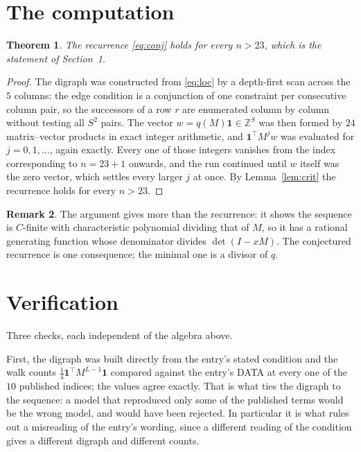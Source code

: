 \documentclass[11pt,a4paper]{article}
\theoremstyle{plain}
\newtheorem{theorem}{Theorem}
\theoremstyle{definition}
\newtheorem{remark}[theorem]{Remark}
\begin{document}
\section{The computation}

\begin{theorem}
The recurrence \eqref{eq:conj} holds for every $n>23$, which is the statement of
Section~1.
\end{theorem}

\begin{proof}
The digraph was constructed from \eqref{eq:loc} by a depth-first scan across the $5$
columns: the edge condition is a conjunction of one constraint per consecutive column
pair, so the successors of a row $r$ are enumerated column by column without testing all
$S^2$ pairs. The vector $w=q(M)\mathbf{1}\in\mathbb{Z}^{S}$ was then formed by $24$
matrix--vector products in exact integer arithmetic, and $\mathbf{1}^{\!\top}M^{j}w$ was
evaluated for $j=0,1,\dots$, again exactly. Every one of those integers vanishes from the
index corresponding to $n=23+1$ onwards, and the run continued until $w$ itself was the
zero vector, which settles every larger $j$ at once. By Lemma~\ref{lem:crit} the recurrence
holds for every $n>23$.
\end{proof}

\begin{remark}
The argument gives more than the recurrence: it shows the sequence is $C$-finite with
characteristic polynomial dividing that of $M$, so it has a rational generating function
whose denominator divides $\det(I-xM)$. The conjectured recurrence is one consequence; the
minimal one is a divisor of $q$.
\end{remark}

\section{Verification}

Three checks, each independent of the algebra above.

First, the digraph was built directly from the entry's stated condition and the walk counts
$\tfrac1{4}\mathbf{1}^{\!\top}M^{L-1}\mathbf{1}$ compared against the entry's DATA at
every one of the $10$ published indices; the values agree exactly. That is what ties
the digraph to the sequence: a model that reproduced only some of the published terms would
be the wrong model, and would have been rejected. In particular it is what rules out a
misreading of the entry's wording, since a different reading of the condition gives a
different digraph and different counts.
\end{document}
